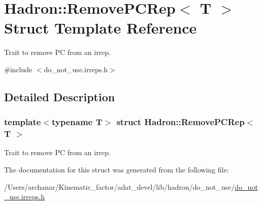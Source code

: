 \hypertarget{structHadron_1_1RemovePCRep}{}\section{Hadron\+:\+:Remove\+P\+C\+Rep$<$ T $>$ Struct Template Reference}
\label{structHadron_1_1RemovePCRep}


Trait to remove PC from an irrep.  




{\ttfamily \#include $<$do\+\_\+not\+\_\+use.\+irreps.\+h$>$}



\subsection{Detailed Description}
\subsubsection*{template$<$typename T$>$\newline
struct Hadron\+::\+Remove\+P\+C\+Rep$<$ T $>$}

Trait to remove PC from an irrep. 

The documentation for this struct was generated from the following file\+:\begin{DoxyCompactItemize}
\item 
/\+Users/archanar/\+Kinematic\+\_\+factor/adat\+\_\+devel/lib/hadron/do\+\_\+not\+\_\+use/\mbox{\hyperlink{do__not__use_8irreps_8h}{do\+\_\+not\+\_\+use.\+irreps.\+h}}\end{DoxyCompactItemize}
